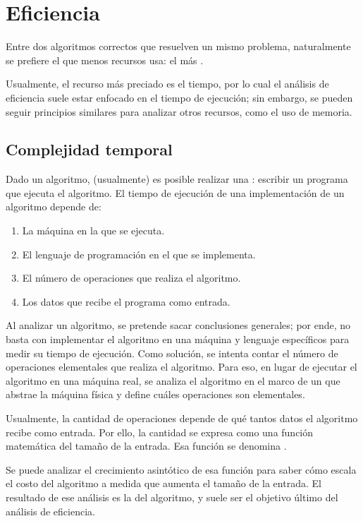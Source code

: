 \section{Eficiencia}
\label{sec:eficiencia}

Entre dos algoritmos correctos que resuelven un mismo problema, naturalmente se prefiere el que menos recursos usa: el más .

Usualmente, el recurso más preciado es el tiempo, por lo cual el análisis de eficiencia suele estar enfocado en el tiempo de ejecución; sin embargo, se pueden seguir principios similares para analizar otros recursos, como el uso de memoria.

\subsection{Complejidad temporal}

Dado un algoritmo, (usualmente) es posible realizar una : escribir un programa que ejecuta el algoritmo. El tiempo de ejecución de una implementación de un algoritmo depende de:
\begin{enumerate}
  \item La máquina en la que se ejecuta.
  \item El lenguaje de programación en el que se implementa.
  \item El número de operaciones que realiza el algoritmo.
  \item Los datos que recibe el programa como entrada.
\end{enumerate}

Al analizar un algoritmo, se pretende sacar conclusiones generales; por ende, no basta con implementar el algoritmo en una máquina y lenguaje específicos para medir su tiempo de ejecución. Como solución, se intenta contar el número de operaciones elementales que realiza el algoritmo. Para eso, en lugar de ejecutar el algoritmo en una máquina real, se analiza el algoritmo en el marco de un  que abstrae la máquina física y define cuáles operaciones son elementales.

Usualmente, la cantidad de operaciones depende de qué tantos datos el algoritmo recibe como entrada. Por ello, la cantidad se expresa como una función matemática del tamaño de la entrada. Esa función se denomina .

Se puede analizar el crecimiento asintótico de esa función para saber cómo escala el costo del algoritmo a medida que aumenta el tamaño de la entrada. El resultado de ese análisis es la  del algoritmo, y suele ser el objetivo último del análisis de eficiencia.


